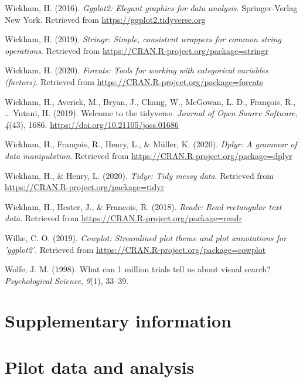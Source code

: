 \documentclass[
  english,
  man]{apa6}
\begin{document}
\leavevmode\hypertarget{ref-R-ggplot2}{}%
Wickham, H. (2016). \emph{Ggplot2: Elegant graphics for data analysis}. Springer-Verlag New York. Retrieved from \url{https://ggplot2.tidyverse.org}

\leavevmode\hypertarget{ref-R-stringr}{}%
Wickham, H. (2019). \emph{Stringr: Simple, consistent wrappers for common string operations}. Retrieved from \url{https://CRAN.R-project.org/package=stringr}

\leavevmode\hypertarget{ref-R-forcats}{}%
Wickham, H. (2020). \emph{Forcats: Tools for working with categorical variables (factors)}. Retrieved from \url{https://CRAN.R-project.org/package=forcats}

\leavevmode\hypertarget{ref-R-tidyverse}{}%
Wickham, H., Averick, M., Bryan, J., Chang, W., McGowan, L. D., François, R., \ldots{} Yutani, H. (2019). Welcome to the tidyverse. \emph{Journal of Open Source Software}, \emph{4}(43), 1686. \url{https://doi.org/10.21105/joss.01686}

\leavevmode\hypertarget{ref-R-dplyr}{}%
Wickham, H., François, R., Henry, L., \& Müller, K. (2020). \emph{Dplyr: A grammar of data manipulation}. Retrieved from \url{https://CRAN.R-project.org/package=dplyr}

\leavevmode\hypertarget{ref-R-tidyr}{}%
Wickham, H., \& Henry, L. (2020). \emph{Tidyr: Tidy messy data}. Retrieved from \url{https://CRAN.R-project.org/package=tidyr}

\leavevmode\hypertarget{ref-R-readr}{}%
Wickham, H., Hester, J., \& Francois, R. (2018). \emph{Readr: Read rectangular text data}. Retrieved from \url{https://CRAN.R-project.org/package=readr}

\leavevmode\hypertarget{ref-R-cowplot}{}%
Wilke, C. O. (2019). \emph{Cowplot: Streamlined plot theme and plot annotations for 'ggplot2'}. Retrieved from \url{https://CRAN.R-project.org/package=cowplot}

\leavevmode\hypertarget{ref-wolfe1998can}{}%
Wolfe, J. M. (1998). What can 1 million trials tell us about visual search? \emph{Psychological Science}, \emph{9}(1), 33--39.

\endgroup

\newpage

\hypertarget{supplementary-information}{%
\section{Supplementary information}\label{supplementary-information}}

\hypertarget{pilot-data-and-analysis}{%
\section{Pilot data and analysis}\label{pilot-data-and-analysis}}
\end{document}
